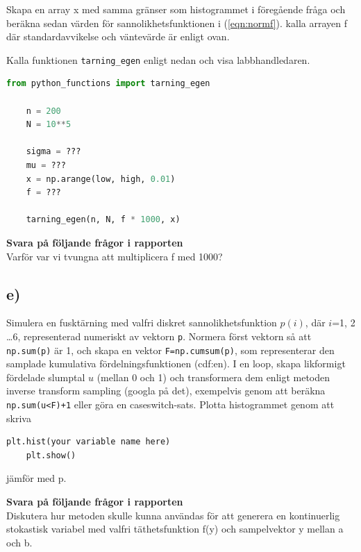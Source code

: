 \documentclass[a4paper]{article}
\begin{document}
Skapa en array x med samma gränser som histogrammet i föregående fråga
och beräkna sedan värden för sannolikhetsfunktionen i (\ref{eqn:normf}).
kalla arrayen f där standardavvikelse och väntevärde är enligt ovan.

Kalla funktionen \lstinline{tarning_egen} enligt nedan och visa labbhandledaren.

\begin{lstlisting}[language=Python]
    from python_functions import tarning_egen

    n = 200
    N = 10**5

    sigma = ???
    mu = ???
    x = np.arange(low, high, 0.01)
    f = ???

    tarning_egen(n, N, f * 1000, x)
\end{lstlisting}

\textbf{Svara på följande frågor i rapporten}\\
Varför var vi tvungna att multiplicera f med 1000?

\newpage
\subsection{e)}
Simulera en fusktärning med valfri diskret sannolikhetsfunktion \( p(i) \), där \(i\)=1, 2 \ldots 6,
representerad numeriskt av vektorn \lstinline{p}. Normera först vektorn så att \lstinline{np.sum(p)} är 1,
och skapa en vektor \lstinline{F=np.cumsum(p)}, som representerar den samplade kumulativa
fördelningsfunktionen (cdf:en). I en loop, skapa likformigt fördelade slumptal \( u \)
(mellan 0 och 1) och transformera dem enligt metoden inverse transform sampling
(googla på det), exempelvis genom att beräkna \lstinline{np.sum(u<F)+1} eller göra en caseswitch-sats.
Plotta histogrammet genom att skriva
\begin{lstlisting}[language=Python]
    plt.hist(your variable name here)
    plt.show()
\end{lstlisting}
jämför med p.

\textbf{Svara på följande frågor i rapporten}\\
Diskutera hur metoden skulle kunna användas för att generera en
kontinuerlig stokastisk variabel med valfri täthetsfunktion f(y) och sampelvektor y
mellan a och b.
\end{document}
